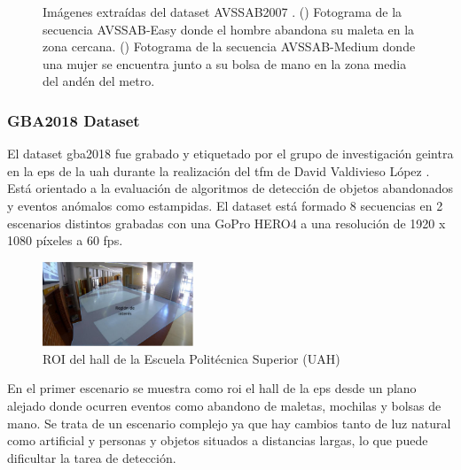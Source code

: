 \begin{figure}[ht]
\begin{subfigure}[b]{0.4\textwidth}
    \caption{}
    \label{fig:avssab2007_2}
  \end{subfigure}
  \caption{Imágenes extraídas del dataset AVSSAB2007 \cite{AVSSAB2007-dataset}.
    (\protect{}) Fotograma de la secuencia AVSSAB-Easy donde el hombre abandona su maleta en la zona cercana.
    (\protect{}) Fotograma de la secuencia AVSSAB-Medium donde una mujer se encuentra junto a su bolsa de mano en la zona media del andén del metro.}
  \label{fig:avssab2007_near_medium}
\end{figure}

\subsubsection{GBA2018 Dataset}

El dataset \gls{gba2018} \cite{gba-dataset} fue grabado y etiquetado por el grupo de investigación \gls{geintra} en la \gls{eps} de la \gls{uah} durante la realización del \gls{tfm} de David Valdivieso López \cite{valdivieso2018}. Está orientado a la evaluación de algoritmos de detección de objetos abandonados y eventos anómalos como estampidas. El dataset está formado 8 secuencias en 2 escenarios distintos grabadas con una GoPro HERO4 a una resolución de 1920 x 1080 píxeles a 60 \gls{fps}.

\begin{figure}[ht]
\centering
\includegraphics[width=0.4\textwidth]{img/chapters/resultados/datasets/hall-eps.jpg}
\caption{\label{fig:roi-hall-eps}ROI del hall de la Escuela Politécnica Superior (UAH)}
\end{figure}

En el primer escenario se muestra como \gls{roi} el hall de la \gls{eps} desde un plano alejado donde ocurren eventos como abandono de maletas, mochilas y bolsas de mano. Se trata de un escenario complejo ya que hay cambios tanto de luz natural como artificial y personas y objetos situados a distancias largas, lo que puede dificultar la tarea de detección.

